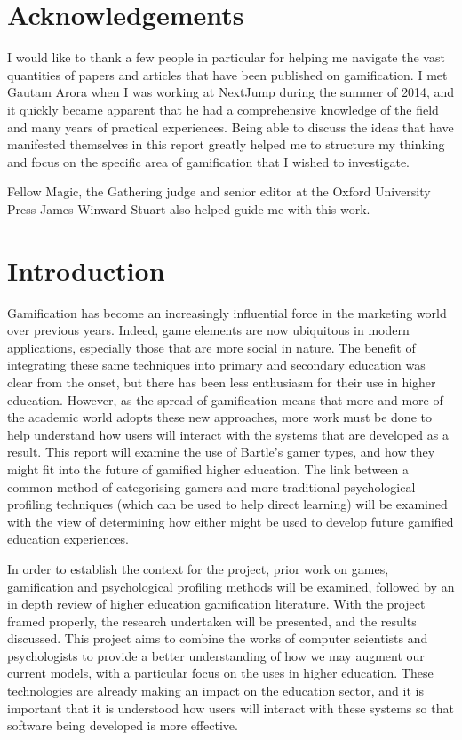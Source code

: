 \documentclass[12pt,a4paper,twoside]{report}
\begin{document}
\section{Acknowledgements}
I would like to thank a few people in particular for helping me navigate the vast quantities of papers and articles that have been published on gamification. I met Gautam Arora when I was working at NextJump during the summer of 2014, and it quickly became apparent that he had a comprehensive knowledge of the field and many years of practical experiences. Being able to discuss the ideas that have manifested themselves in this report greatly helped me to structure my thinking and focus on the specific area of gamification that I wished to investigate.

Fellow Magic, the Gathering judge and senior editor at the Oxford University Press James Winward-Stuart also helped guide me with this work.

\section{Introduction}
Gamification has become an increasingly influential force in the marketing world over previous years. Indeed, game elements are now ubiquitous in modern applications, especially those that are more social in nature. The benefit of integrating these same techniques into primary and secondary education was clear from the onset, but there has been less enthusiasm for their use in higher education. However, as the spread of gamification means that more and more of the academic world adopts these new approaches, more work must be done to help understand how users will interact with the systems that are developed as a result. This report will examine the use of Bartle's gamer types, and how they might fit into the future of gamified higher education. The link between a common method of categorising gamers and more traditional psychological profiling techniques (which can be used to help direct learning) will be examined with the view of determining how either might be used to develop future gamified education experiences.

In order to establish the context for the project, prior work on games, gamification and psychological profiling methods will be examined, followed by an in depth review of higher education gamification literature. With the project framed properly, the research undertaken will be presented, and the results discussed. This project aims to combine the works of computer scientists and psychologists to provide a better understanding of how we may augment our current models, with a particular focus on the uses in higher education. These technologies are already making an impact on the education sector, and it is important that it is understood how users will interact with these systems so that software being developed is more effective.
\end{document}
